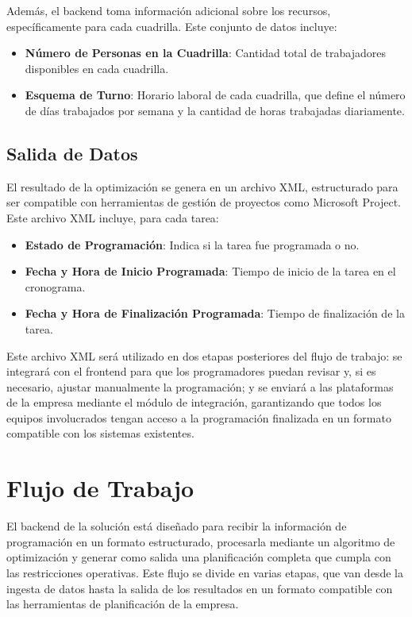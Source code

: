 \documentclass{article}
\begin{document}
Además, el backend toma información adicional sobre los recursos, específicamente para cada cuadrilla. Este conjunto de datos incluye:

\begin{itemize}
    \item \textbf{Número de Personas en la Cuadrilla}: Cantidad total de trabajadores disponibles en cada cuadrilla.
    \item \textbf{Esquema de Turno}: Horario laboral de cada cuadrilla, que define el número de días trabajados por semana y la cantidad de horas trabajadas diariamente.
\end{itemize}


\subsection{Salida de Datos}

El resultado de la optimización se genera en un archivo XML, estructurado para ser compatible con herramientas de gestión de proyectos como Microsoft Project. Este archivo XML incluye, para cada tarea:

\begin{itemize}
    \item \textbf{Estado de Programación}: Indica si la tarea fue programada o no.
    \item \textbf{Fecha y Hora de Inicio Programada}: Tiempo de inicio de la tarea en el cronograma.
    \item \textbf{Fecha y Hora de Finalización Programada}: Tiempo de finalización de la tarea.
\end{itemize}

Este archivo XML será utilizado en dos etapas posteriores del flujo de trabajo: se integrará con el frontend para que los programadores puedan revisar y, si es necesario, ajustar manualmente la programación; y se enviará a las plataformas de la empresa mediante el módulo de integración, garantizando que todos los equipos involucrados tengan acceso a la programación finalizada en un formato compatible con los sistemas existentes.


\section{Flujo de Trabajo}

El backend de la solución está diseñado para recibir la información de programación en un formato estructurado, procesarla mediante un algoritmo de optimización y generar como salida una planificación completa que cumpla con las restricciones operativas. Este flujo se divide en varias etapas, que van desde la ingesta de datos hasta la salida de los resultados en un formato compatible con las herramientas de planificación de la empresa.
\end{document}
